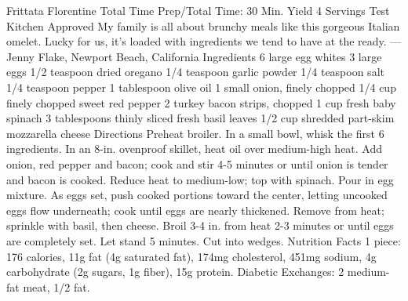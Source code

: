 Frittata Florentine Total Time Prep/Total Time: 30 Min. Yield 4 Servings Test Kitchen Approved My family is all about brunchy meals like this gorgeous Italian omelet. Lucky for us, it’s loaded with ingredients we tend to have at the ready. —Jenny Flake, Newport Beach, California Ingredients 6 large egg whites 3 large eggs 1/2 teaspoon dried oregano 1/4 teaspoon garlic powder 1/4 teaspoon salt 1/4 teaspoon pepper 1 tablespoon olive oil 1 small onion, finely chopped 1/4 cup finely chopped sweet red pepper 2 turkey bacon strips, chopped 1 cup fresh baby spinach 3 tablespoons thinly sliced fresh basil leaves 1/2 cup shredded part-skim mozzarella cheese Directions Preheat broiler. In a small bowl, whisk the first 6 ingredients. In an 8-in. ovenproof skillet, heat oil over medium-high heat. Add onion, red pepper and bacon; cook and stir 4-5 minutes or until onion is tender and bacon is cooked. Reduce heat to medium-low; top with spinach. Pour in egg mixture. As eggs set, push cooked portions toward the center, letting uncooked eggs flow underneath; cook until eggs are nearly thickened. Remove from heat; sprinkle with basil, then cheese. Broil 3-4 in. from heat 2-3 minutes or until eggs are completely set. Let stand 5 minutes. Cut into wedges. Nutrition Facts 1 piece: 176 calories, 11g fat (4g saturated fat), 174mg cholesterol, 451mg sodium, 4g carbohydrate (2g sugars, 1g fiber), 15g protein. Diabetic Exchanges: 2 medium-fat meat, 1/2 fat.
\par

